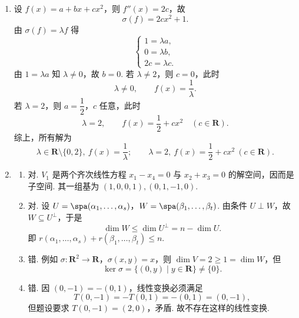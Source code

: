 \begin{enumerate}
    \item 设 $f(x)=a+bx+cx^2$，则 $f''(x)=2c$，故
    \[
        \sigma(f)=2cx^2+1.
    \]
    由 $\sigma(f)=\lambda f$ 得
    \[
        \begin{cases}
            1=\lambda a,\\
            0=\lambda b,\\
            2c=\lambda c.
        \end{cases}
    \]
    由 $1=\lambda a$ 知 $\lambda\neq 0$，故 $b=0$. 若 $\lambda\neq 2$，则 $c=0$，此时
    \[
        \lambda\neq 0,\qquad f(x)=\frac1\lambda.
    \]
    若 $\lambda=2$，则 $a=\dfrac12$，$c$ 任意，此时
    \[
        \lambda=2,\qquad f(x)=\frac12+cx^2\quad(c\in\mathbf{R}).
    \]
    综上，所有解为
    \[
        \lambda\in\mathbf{R}\setminus\{0,2\},\ f(x)=\frac1\lambda;
        \qquad
        \lambda=2,\ f(x)=\frac12+cx^2\ (c\in\mathbf{R}).
    \]

    \item
    \begin{enumerate}
        \item 对. $V_1$ 是两个齐次线性方程 $x_1-x_4=0$ 与 $x_2+x_3=0$ 的解空间，因而是子空间. 其一组基为 $(1,0,0,1),(0,1,-1,0)$.

        \item 对. 设 $U=\spa(\alpha_1,\ldots,\alpha_s)$，$W=\spa(\beta_1,\ldots,\beta_t)$. 由条件 $U\perp W$，故 $W\subseteq U^{\perp}$，于是
        \[
            \dim W\leqslant\dim U^{\perp}=n-\dim U.
        \]
        即 $r(\alpha_1,\ldots,\alpha_s)+r(\beta_1,\ldots,\beta_t)\leqslant n$.

        \item 错. 例如 $\sigma:\mathbf{R}^2\to\mathbf{R}$，$\sigma(x,y)=x$，则 $\dim V=2\geqslant1=\dim W$，但
        \[
            \ker\sigma=\{(0,y)\mid y\in\mathbf{R}\}\neq\{0\}.
        \]

        \item 错. 因 $(0,-1)=-(0,1)$，线性变换必须满足
        \[
            T(0,-1)=-T(0,1)=-(0,1)=(0,-1),
        \]
        但题设要求 $T(0,-1)=(2,0)$，矛盾. 故不存在这样的线性变换.
    \end{enumerate}
\end{enumerate}

\clearpage
